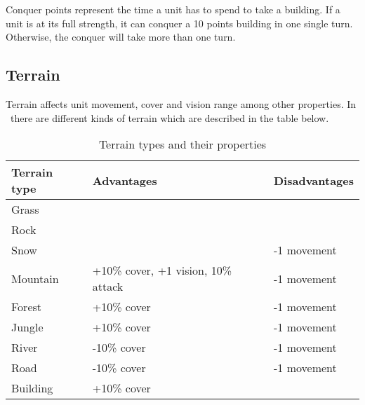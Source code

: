 Conquer points represent the time a unit has to spend to take a building. If a
unit is at its full strength, it can conquer a 10 points building in one single
turn. Otherwise, the conquer will take more than one turn.\\

\subsection{Terrain}


Terrain affects unit movement, cover and vision range among other properties.
In \game\ there are different kinds of terrain which are described in the table
below.\\

\begin{table}[H]
    \label{tab:terrain}
    \begin{center}
    \begin{tabular}{| l | m{5cm} | m{5cm} |}
        \hline
        \textbf{Terrain type} & \textbf{Advantages} & \textbf{Disadvantages} \\
        \hline
        Grass &  &  \\
        \hline
        Rock &  &  \\
        \hline
        Snow &  & -1 movement \\
        \hline
        Mountain & +10\% cover, +1 vision, 10\% attack & -1 movement \\
        \hline
        Forest & +10\% cover & -1 movement \\
        \hline
        Jungle & +10\% cover & -1 movement \\
        \hline
        River & -10\% cover & -1 movement \\
        \hline
        Road & -10\% cover & -1 movement \\
        \hline
        Building & +10\% cover &  \\
        \hline
    \end{tabular}
    \end{center}
\caption{Terrain types and their properties}
\end{table}



